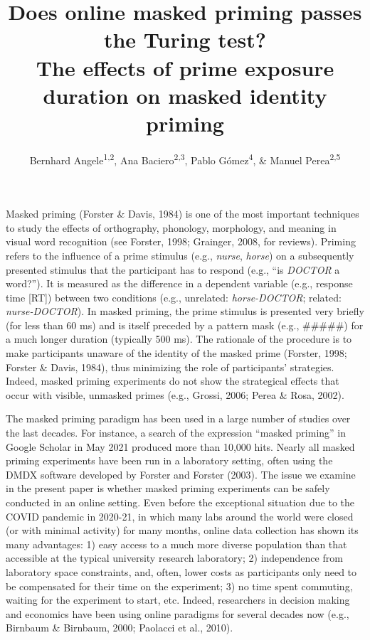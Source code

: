 \documentclass[
  english,
  man,floatsintext]{apa6}
\title{Does online masked priming passes the Turing test?\\
The effects of prime exposure duration on masked identity priming}
\author{Bernhard Angele\textsuperscript{1,2}, Ana Baciero\textsuperscript{2,3}, Pablo Gómez\textsuperscript{4}, \& Manuel Perea\textsuperscript{2,5}}
\date{}
\affiliation{\vspace{0.5cm}\textsuperscript{1} Bournemouth University, Bournemouth, UK\\\textsuperscript{2} Universidad Antonio de Nebrija, Madrid, Spain\\\textsuperscript{3} DePaul University, Chicago, USA\\\textsuperscript{4} California State University San Bernardino, Palm Desert Campus, USA\\\textsuperscript{5} Universitat de València, Valencia, Spain}
\begin{document}
\maketitle

Masked priming (Forster \& Davis, 1984) is one of the most important techniques to study the effects of orthography, phonology, morphology, and meaning in visual word recognition (see Forster, 1998; Grainger, 2008, for reviews). Priming refers to the influence of a prime stimulus (e.g., \emph{nurse}, \emph{horse}) on a subsequently presented stimulus that the participant has to respond (e.g., ``is \emph{DOCTOR} a word?''). It is measured as the difference in a dependent variable (e.g., response time {[}RT{]}) between two conditions (e.g., unrelated: \emph{horse-DOCTOR}; related: \emph{nurse-DOCTOR}). In masked priming, the prime stimulus is presented very briefly (for less than 60 ms) and is itself preceded by a pattern mask (e.g., \#\#\#\#\#) for a much longer duration (typically 500 ms). The rationale of the procedure is to make participants unaware of the identity of the masked prime (Forster, 1998; Forster \& Davis, 1984), thus minimizing the role of participants' strategies. Indeed, masked priming experiments do not show the strategical effects that occur with visible, unmasked primes (e.g., Grossi, 2006; Perea \& Rosa, 2002).

The masked priming paradigm has been used in a large number of studies over the last decades. For instance, a search of the expression ``masked priming'' in Google Scholar in May 2021 produced more than 10,000 hits. Nearly all masked priming experiments have been run in a laboratory setting, often using the DMDX software developed by Forster and Forster (2003). The issue we examine in the present paper is whether masked priming experiments can be safely conducted in an online setting. Even before the exceptional situation due to the COVID pandemic in 2020-21, in which many labs around the world were closed (or with minimal activity) for many months, online data collection has shown its many advantages: 1) easy access to a much more diverse population than that accessible at the typical university research laboratory; 2) independence from laboratory space constraints, and, often, lower costs as participants only need to be compensated for their time on the experiment; 3) no time spent commuting, waiting for the experiment to start, etc. Indeed, researchers in decision making and economics have been using online paradigms for several decades now (e.g., Birnbaum \& Birnbaum, 2000; Paolacci et al., 2010).
\end{document}
